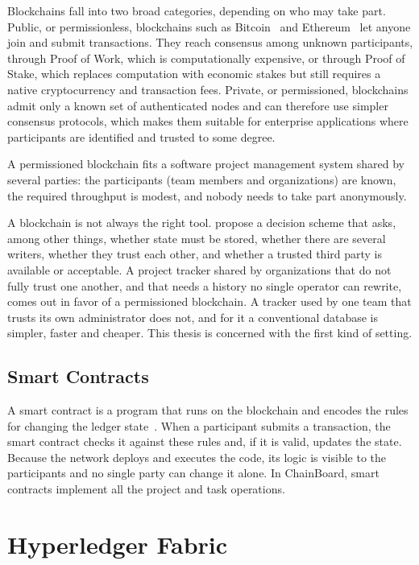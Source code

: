 Blockchains fall into two broad categories, depending on who may take part. Public, or permissionless, blockchains such as Bitcoin~\cite{nakamoto2008bitcoin} and Ethereum~\cite{ethereum} let anyone join and submit transactions. They reach consensus among unknown participants, through Proof of Work, which is computationally expensive, or through Proof of Stake, which replaces computation with economic stakes but still requires a native cryptocurrency and transaction fees. Private, or permissioned, blockchains admit only a known set of authenticated nodes and can therefore use simpler consensus protocols, which makes them suitable for enterprise applications where participants are identified and trusted to some degree.

A permissioned blockchain fits a software project management system shared by several parties: the participants (team members and organizations) are known, the required throughput is modest, and nobody needs to take part anonymously.

A blockchain is not always the right tool. \textcite{wust2018need} propose a decision scheme that asks, among other things, whether state must be stored, whether there are several writers, whether they trust each other, and whether a trusted third party is available or acceptable. A project tracker shared by organizations that do not fully trust one another, and that needs a history no single operator can rewrite, comes out in favor of a permissioned blockchain. A tracker used by one team that trusts its own administrator does not, and for it a conventional database is simpler, faster and cheaper. This thesis is concerned with the first kind of setting.

\subsection{Smart Contracts}
\label{sec:smart-contracts}

A smart contract is a program that runs on the blockchain and encodes the rules for changing the ledger state~\cite{szabo1997}. When a participant submits a transaction, the smart contract checks it against these rules and, if it is valid, updates the state. Because the network deploys and executes the code, its logic is visible to the participants and no single party can change it alone. In ChainBoard, smart contracts implement all the project and task operations.

\section{Hyperledger Fabric}
\label{sec:fabric}

